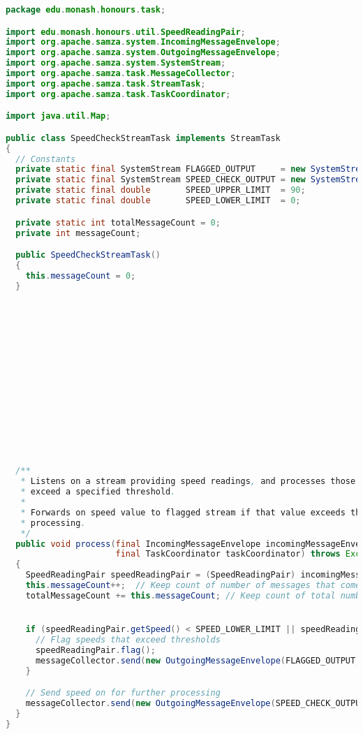 \clearpage
\begin{lstlisting}[language=java,caption=edu.monash.honours.task.SpeedCheckStreamTask (Java),label=samza-task]
package edu.monash.honours.task;

import edu.monash.honours.util.SpeedReadingPair;
import org.apache.samza.system.IncomingMessageEnvelope;
import org.apache.samza.system.OutgoingMessageEnvelope;
import org.apache.samza.system.SystemStream;
import org.apache.samza.task.MessageCollector;
import org.apache.samza.task.StreamTask;
import org.apache.samza.task.TaskCoordinator;

import java.util.Map;

public class SpeedCheckStreamTask implements StreamTask
{
  // Constants
  private static final SystemStream FLAGGED_OUTPUT     = new SystemStream("kafka", "flagged-output");
  private static final SystemStream SPEED_CHECK_OUTPUT = new SystemStream("kafka", "speed-check-output");
  private static final double       SPEED_UPPER_LIMIT  = 90;
  private static final double       SPEED_LOWER_LIMIT  = 0;

  private static int totalMessageCount = 0;
  private int messageCount;

  public SpeedCheckStreamTask()
  {
    this.messageCount = 0;
  }















  /**
   * Listens on a stream providing speed readings, and processes those speed readings depending on whether or not they
   * exceed a specified threshold.
   *
   * Forwards on speed value to flagged stream if that value exceeds thresholds, else forwards on speed for further
   * processing.
   */
  public void process(final IncomingMessageEnvelope incomingMessageEnvelope, final MessageCollector messageCollector,
                      final TaskCoordinator taskCoordinator) throws Exception
  {
    SpeedReadingPair speedReadingPair = (SpeedReadingPair) incomingMessageEnvelope.getMessage();
    this.messageCount++;  // Keep count of number of messages that come through here
    totalMessageCount += this.messageCount; // Keep count of total number of messages received on this stream.


    if (speedReadingPair.getSpeed() < SPEED_LOWER_LIMIT || speedReadingPair.getSpeed() > SPEED_UPPER_LIMIT) {
      // Flag speeds that exceed thresholds
      speedReadingPair.flag();
      messageCollector.send(new OutgoingMessageEnvelope(FLAGGED_OUTPUT, speedReadingPair));
    }

    // Send speed on for further processing
    messageCollector.send(new OutgoingMessageEnvelope(SPEED_CHECK_OUTPUT, speedReadingPair));
  }
}
\end{lstlisting}

